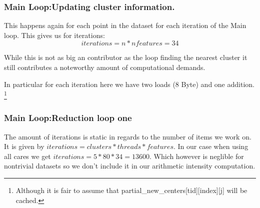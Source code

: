 \subsubsection{Main Loop:Updating cluster information.}
This happens again for each point in the dataset for each iteration of the Main loop.
This gives us for iterations:
$$iterations = n * nfeatures = 34$$

While this is not as big an contributor as the loop finding the nearest cluster
it still contributes a noteworthy amount of computational demands.

In particular for each iteration here we have two loads (8 Byte) and one addition.
\footnote{Although it is fair to assume that partial\_new\_centers[tid][index][j] will be cached.}


\subsubsection{Main Loop:Reduction loop one}

The amount of iterations is static in regards to the number of items we work on.
It is given by $ iterations = clusters * threads * features$.
In our case when using all cares we get $ iterations = 5 * 80  * 34 = 13600$.
Which however is neglible for nontrivial datasets so we don't include it in our arithmetic intensity computation. 

%
%


